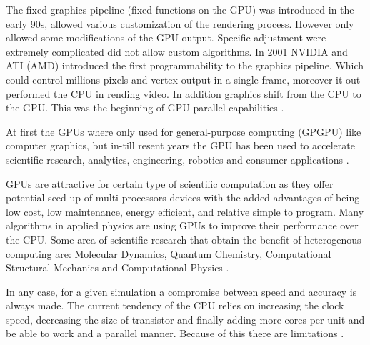 The fixed graphics pipeline (fixed functions on the GPU) was introduced in the early 90s, allowed various customization of the rendering process. However only allowed some modifications of the GPU output. Specific adjustment were extremely complicated did not allow custom algorithms. In 2001 NVIDIA and ATI (AMD) introduced the first programmability to the graphics pipeline. Which could control millions pixels and vertex output in a single frame, moreover it out-performed the CPU in rending video. In addition graphics shift from the CPU to the GPU. This was the beginning of GPU parallel capabilities \cite{Nickolls}.

At first the GPUs where only used for general-purpose computing (GPGPU) like computer graphics, but in-till resent years the GPU has been used to accelerate scientific research, analytics, engineering, robotics and consumer applications \cite{physicsgpu}.

GPUs are attractive for certain type of scientific computation as they offer potential seed-up of multi-processors devices with the added advantages of being low cost, low maintenance, energy efficient, and relative simple to program. Many algorithms in applied physics are using GPUs to improve their performance over the CPU. Some area of scientific research that obtain the benefit of heterogenous computing are: Molecular Dynamics, Quantum Chemistry, Computational Structural Mechanics and Computational Physics \cite{applications}.

In any case, for a given simulation a compromise between speed and accuracy is always made. The current tendency of the CPU relies on increasing the clock speed, decreasing the size of transistor and finally adding more cores per unit and be able to work and a parallel manner. Because of this there are limitations \cite{quantitative}.

